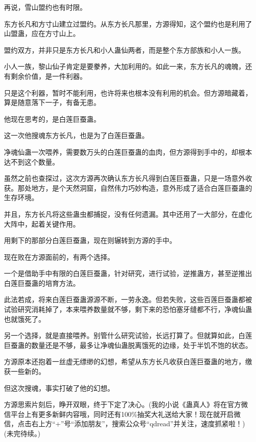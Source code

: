 \begin{this_body}
再说，雪山盟约也有时限。

东方长凡和方寸山建立过盟约。从东方长凡那里，方源得知，这个盟约也是利用了山盟蛊，应在方寸山上。

盟约双方，并非只是东方长凡和小人蛊仙两者，而是整个东方部族和小人一族。

小人一族，黎山仙子肯定是要豢养，大加利用的。如此一来，东方长凡的魂魄，还有剩余价值，是一件利器。

只是这个利器，暂时不能利用，也许将来也根本没有利用的机会。但方源暗藏着，算是随意落下一子，有备无患。

他现在思考的，是白莲巨蚕蛊。

这一次他搜魂东方长凡，也是为了白莲巨蚕蛊。

净魂仙蛊一次喂养，需要数万头的白莲巨蚕蛊的血肉，但方源得到手中的，却根本达不到这个数量。

虽然之前也查探过，这次方源再次确认东方长凡得到白莲巨蚕蛊，只是一场意外收获。那处地方，是个天然洞窟，自然伟力巧妙构造，意外形成了适合白莲巨蚕蛊的生存环境。

并且，东方长凡将这些蛊虫都捕捉，没有任何遗漏。其中还用了一大部分，在虚化大阵中，起着关键作用。

用剩下的那部分白莲巨蚕蛊，现在则辗转到方源的手中。

现在败在方源面前的，有两个选择。

一个是借助手中有限的白莲巨蚕蛊，针对研究，进行试验，逆推蛊方，甚至逆推出白莲巨蚕蛊的培育方法。

此法若成，将来白莲巨蚕蛊源源不断，一劳永逸。但若失败，这些百莲巨蚕蛊都被试验研究消耗掉了，本来喂养数量就不够，剩下来的恐怕塞牙缝都不行，净魂仙蛊也就饿死了。

另一个选择，就是直接喂养。别管什么研究试验，长远打算了。但就算如此，白莲巨蚕蛊的数量还是不够，最多让净魂仙蛊脱离饿死的边缘，处于半饥不饱的状态。

方源原本还抱着一丝虚无缥缈的幻想，希望从东方长凡收获白莲巨蚕蛊的地方，缴获一些新的。

但这次搜魂，事实打破了他的幻想。

方源思索片刻后，睁开双眼，终于下定了决心。(我的小说《蛊真人》将在官方微信平台上有更多新鲜内容哦，同时还有100\%抽奖大礼送给大家！现在就开启微信，点击右上方“+”号“添加朋友”，搜索公众号“qdread”并关注，速度抓紧啦！)(未完待续。)

\end{this_body}

